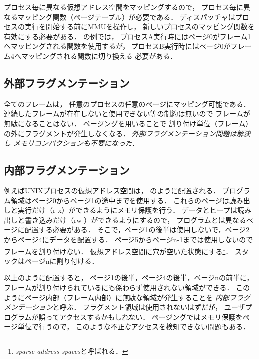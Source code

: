 プロセス毎に異なる仮想アドレス空間をマッピングするので，
プロセス毎に異なるマッピング関数（ページテーブル）が必要である．
ディスパッチャはプロセスの実行を開始する前にMMUを操作し，
新しいプロセスのマッピング関数を有効にする必要がある．
の例では，
プロセスA実行時にはページ0がフレーム1へマッピングされる関数を使用するが，
プロセスB実行時にはページ0がフレーム4へマッピングされる関数に切り換える
必要がある．

\subsection{外部フラグメンテーション}
全てのフレームは，
任意のプロセスの任意のページにマッピング可能である．
連続したフレームが存在しないと使用できない等の制約は無いので
フレームが無駄になることはない．
ページングを用いることで
割り付け単位（フレーム）の外にフラグメントが発生しなくなる．
\emph{外部フラグメンテーション問題は解決し
  メモリコンパクションも不要になった}．

\subsection{内部フラグメンテーション}
例えばUNIXプロセスの仮想アドレス空間は，
のように配置される．
プログラム領域はページ0からページ1の途中までを使用する．
これらのページは読み出しと実行だけ（r-x）ができるようにメモリ保護を行う．
データとヒープは読み出しと書き込みだけ（rw-）ができるようにするので，
プログラムとは異なるページに配置する必要がある．
そこで，ページ1の後半は使用しないで，ページ2からページ4にデータを配置する．
ページ5からページn-1までは使用しないのでフレームを割り付けない．
仮想アドレス空間に穴が空いた状態にする\footnote{
  \emph{sparse address spaces}と呼ばれる．}．
スタックはページnに割り付ける．

以上のように配置すると，
ページ1の後半，ページ4の後半，ページnの前半に，
フレームが割り付けられているにも係わらず使用されない領域ができる．
このようにページ内部（フレーム内部）に無駄な領域が発生することを
\emph{内部フラグメンテーション}と呼ぶ．
フラグメント領域は使用されないはずだが，
ユーザプログラムが誤ってアクセスするかもしれない．
ページングではメモリ保護をページ単位で行うので，
このような不正なアクセスを検知できない問題もある．

